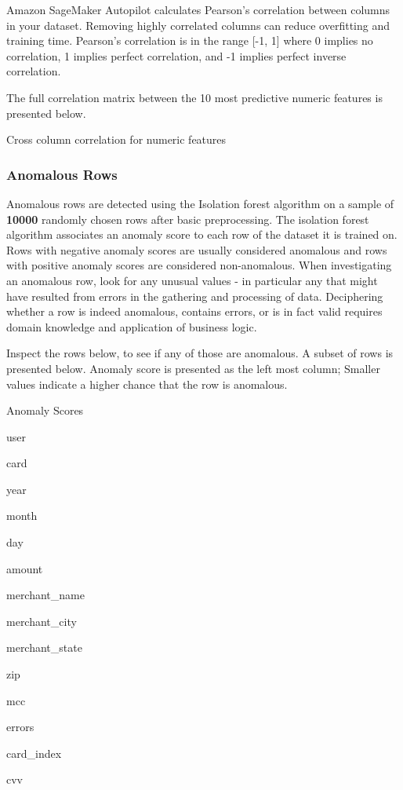 \documentclass[11pt]{article}
\begin{document}
Amazon SageMaker Autopilot calculates Pearson's correlation between
columns in your dataset. Removing highly correlated columns can reduce
overfitting and training time. Pearson's correlation is in the range
{[}-1, 1{]} where 0 implies no correlation, 1 implies perfect
correlation, and -1 implies perfect inverse correlation.

The full correlation matrix between the 10 most predictive numeric
features is presented below.

Cross column correlation for numeric features

    \hypertarget{anomalous-rows}{%
\subsubsection{Anomalous Rows}\label{anomalous-rows}}

Anomalous rows are detected using the Isolation forest algorithm on a
sample of \textbf{10000} randomly chosen rows after basic preprocessing.
The isolation forest algorithm associates an anomaly score to each row
of the dataset it is trained on. Rows with negative anomaly scores are
usually considered anomalous and rows with positive anomaly scores are
considered non-anomalous. When investigating an anomalous row, look for
any unusual values - in particular any that might have resulted from
errors in the gathering and processing of data. Deciphering whether a
row is indeed anomalous, contains errors, or is in fact valid requires
domain knowledge and application of business logic.

Inspect the rows below, to see if any of those are anomalous. A subset
of rows is presented below. Anomaly score is presented as the left most
column; Smaller values indicate a higher chance that the row is
anomalous.

Anomaly Scores

user

card

year

month

day

amount

merchant\_name

merchant\_city

merchant\_state

zip

mcc

errors

card\_index

cvv
\end{document}
